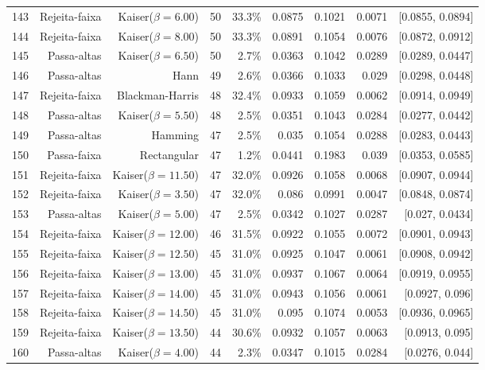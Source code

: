\begin{longtable}{lrrrrrrrr}
    143 & Rejeita-faixa & Kaiser($\beta=6.00$) & 50 & 33.3\% & 0.0875 & 0.1021 & 0.0071 & [0.0855, 0.0894] \\
    144 & Rejeita-faixa & Kaiser($\beta=8.00$) & 50 & 33.3\% & 0.0891 & 0.1054 & 0.0076 & [0.0872, 0.0912] \\
    145 & Passa-altas & Kaiser($\beta=6.50$) & 50 & 2.7\% & 0.0363 & 0.1042 & 0.0289 & [0.0289, 0.0447] \\
    146 & Passa-altas & Hann & 49 & 2.6\% & 0.0366 & 0.1033 & 0.029 & [0.0298, 0.0448] \\
    147 & Rejeita-faixa & Blackman-Harris & 48 & 32.4\% & 0.0933 & 0.1059 & 0.0062 & [0.0914, 0.0949] \\
    148 & Passa-altas & Kaiser($\beta=5.50$) & 48 & 2.5\% & 0.0351 & 0.1043 & 0.0284 & [0.0277, 0.0442] \\
    149 & Passa-altas & Hamming & 47 & 2.5\% & 0.035 & 0.1054 & 0.0288 & [0.0283, 0.0443] \\
    150 & Passa-faixa & Rectangular & 47 & 1.2\% & 0.0441 & 0.1983 & 0.039 & [0.0353, 0.0585] \\
    151 & Rejeita-faixa & Kaiser($\beta=11.50$) & 47 & 32.0\% & 0.0926 & 0.1058 & 0.0068 & [0.0907, 0.0944] \\
    152 & Rejeita-faixa & Kaiser($\beta=3.50$) & 47 & 32.0\% & 0.086 & 0.0991 & 0.0047 & [0.0848, 0.0874] \\
    153 & Passa-altas & Kaiser($\beta=5.00$) & 47 & 2.5\% & 0.0342 & 0.1027 & 0.0287 & [0.027, 0.0434] \\
    154 & Rejeita-faixa & Kaiser($\beta=12.00$) & 46 & 31.5\% & 0.0922 & 0.1055 & 0.0072 & [0.0901, 0.0943] \\
    155 & Rejeita-faixa & Kaiser($\beta=12.50$) & 45 & 31.0\% & 0.0925 & 0.1047 & 0.0061 & [0.0908, 0.0942] \\
    156 & Rejeita-faixa & Kaiser($\beta=13.00$) & 45 & 31.0\% & 0.0937 & 0.1067 & 0.0064 & [0.0919, 0.0955] \\
    157 & Rejeita-faixa & Kaiser($\beta=14.00$) & 45 & 31.0\% & 0.0943 & 0.1056 & 0.0061 & [0.0927, 0.096] \\
    158 & Rejeita-faixa & Kaiser($\beta=14.50$) & 45 & 31.0\% & 0.095 & 0.1074 & 0.0053 & [0.0936, 0.0965] \\
    159 & Rejeita-faixa & Kaiser($\beta=13.50$) & 44 & 30.6\% & 0.0932 & 0.1057 & 0.0063 & [0.0913, 0.095] \\
    160 & Passa-altas & Kaiser($\beta=4.00$) & 44 & 2.3\% & 0.0347 & 0.1015 & 0.0284 & [0.0276, 0.044] \\

\end{longtable}
